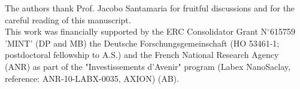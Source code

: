 \documentclass[aip,graphicx,numerical]{revtex4-1}
\begin{document}
%

\begin{acknowledgments}

The authors thank Prof. Jacobo Santamaria for fruitful discussions and for the careful reading of this manuscript.\\This work was financially supported by the ERC Consolidator Grant N$^{\circ}$615759 'MINT' (DP and MB) the Deutsche Forschungsgemeinschaft (HO 53461-1; postdoctoral fellowship to A.S.) and the French National Research Agency (ANR) as part of the "Investissements d'Avenir" program (Labex NanoSaclay, reference: ANR-10-LABX-0035, AXION) (AB).


\end{acknowledgments}
\end{document}
